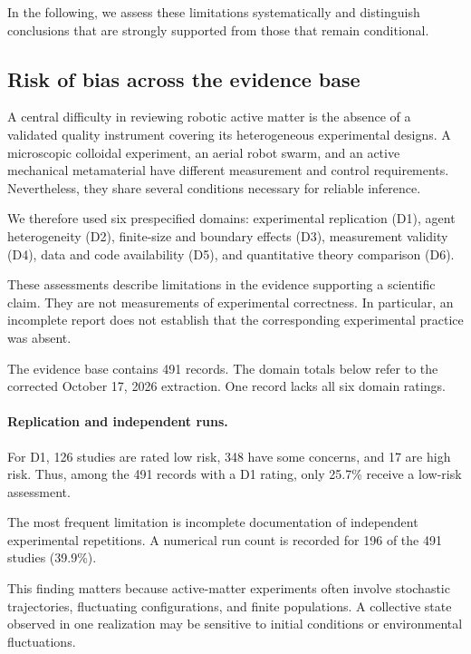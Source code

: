 In the following, we assess these limitations
systematically and distinguish conclusions
that are strongly supported from those
that remain conditional.

\subsection{Risk of bias across the evidence base}
\label{sec:discussion-risk}

A central difficulty in reviewing robotic active matter
is the absence of a validated quality instrument
covering its heterogeneous experimental designs.
A microscopic colloidal experiment, an aerial
robot swarm, and an active mechanical metamaterial
have different measurement and control requirements.
Nevertheless, they share several conditions
necessary for reliable inference.

We therefore used six prespecified domains:
experimental replication (D1), agent
heterogeneity (D2), finite-size and boundary
effects (D3), measurement validity (D4),
data and code availability (D5), and
quantitative theory comparison (D6).

These assessments describe limitations in
the evidence supporting a scientific claim.
They are not measurements of experimental
correctness. In particular, an incomplete
report does not establish that the
corresponding experimental practice
was absent.

The evidence base contains 491 records.
The domain totals below refer to the
corrected October 17, 2026 extraction.
One record lacks all six domain ratings.

\paragraph*{Replication and independent runs.}

For D1, 126 studies are rated low risk,
348 have some concerns, and 17 are
high risk. Thus, among the 491 records
with a D1 rating, only 25.7\%
receive a low-risk assessment.

The most frequent limitation is incomplete
documentation of independent experimental
repetitions. A numerical run count is
recorded for 196 of the
491 studies (39.9\%).

This finding matters because active-matter
experiments often involve stochastic
trajectories, fluctuating configurations,
and finite populations. A collective state
observed in one realization may be sensitive
to initial conditions or environmental
fluctuations.

